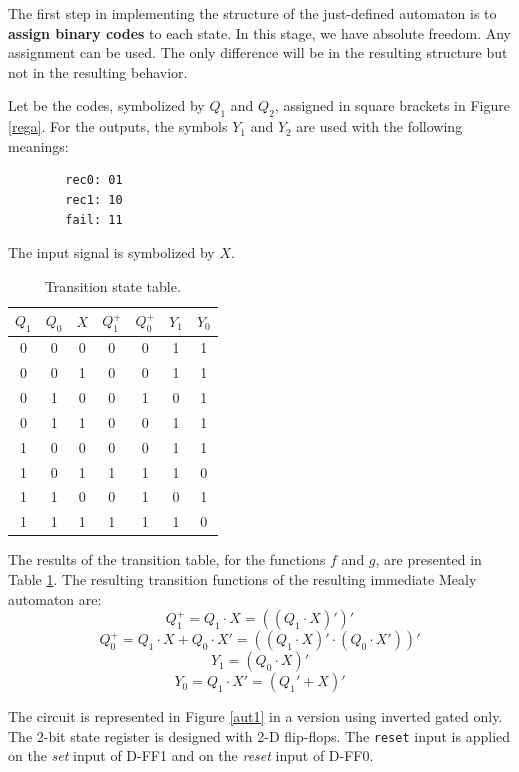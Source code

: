 \begin{exemplu}
The first step in implementing the structure of the just-defined
automaton is to {\bf assign binary codes} to each state.
In this stage, we have absolute freedom. Any assignment can be
used. The only difference will be in the resulting structure but
not in the resulting behavior.

Let be the codes, symbolized by $Q_1$ and $Q_2$, assigned in square brackets
in Figure \ref{rega}. For the outputs, the symbols $Y_1$ and $Y_2$ are used with the following meanings:
\begin{verbatim}
        rec0: 01
        rec1: 10
        fail: 11
\end{verbatim}
The input signal is symbolized by $X$.

\begin{table}[H]
  \begin{center}
    \caption{Transition state table.}
    \label{table1}
    \begin{tabular}{|c|c|c||c|c|c|c|}
      \hline
     $Q_1$ & $Q_0$& $X$& $Q^+_1$& $Q^+_0$ & $Y_1$ & $Y_0$\\
     \hline \hline
   0&       0&     0&        0&       0 & 1  & 1 \\ \hline
   0&       0&     1&        0&       0 & 1  & 1 \\ \hline
   0&       1&     0&        0&       1 & 0  & 1 \\ \hline
   0&       1&     1&        0&       0 & 1  & 1 \\ \hline
   1&       0&     0&        0&       0 & 1  & 1 \\ \hline
   1&       0&     1&        1&       1 & 1  & 0 \\ \hline
   1&       1&     0&        0&       1 & 0  & 1 \\ \hline
   1&       1&     1&        1&       1 & 1  & 0 \\ \hline
    \end{tabular}
  \end{center}
\end{table}


The results of the transition table, for the functions $f$ and $g$, are presented in
Table \ref{table1}. The resulting transition functions of the resulting immediate Mealy automaton are:
$$Q_{1}^{+} = Q_{1} \cdot X = ((Q_{1} \cdot X)')'$$
$$Q_{0}^{+} = Q_{1} \cdot X + Q_{0} \cdot X' = ((Q_{1} \cdot X)' \cdot (Q_{0} \cdot X'))'$$
$$Y_1 = (Q_0 \cdot X)'$$
$$Y_0 = Q_1 \cdot X' = (Q_1' + X)'$$

The circuit is represented in Figure \ref{aut1} in a version using inverted gated
only. The 2-bit state register is designed with 2-D flip-flops. The
{\tt reset}  input is applied on the {\em set} input of D-FF1 and
on the {\em reset} input of D-FF0.


\end{exemplu}
